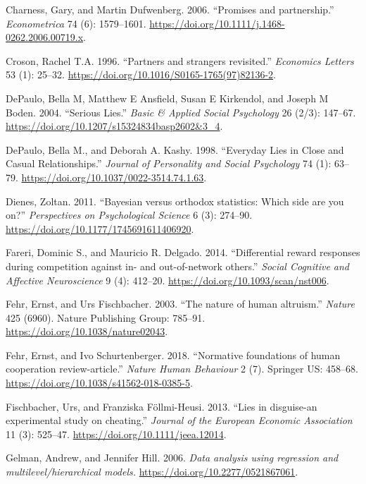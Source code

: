 \documentclass[smallextended]{svjour3}       %
\begin{document}
\leavevmode\hypertarget{ref-Charness2006}{}%
Charness, Gary, and Martin Dufwenberg. 2006. ``Promises and
partnership.'' \emph{Econometrica} 74 (6): 1579--1601.
\url{https://doi.org/10.1111/j.1468-0262.2006.00719.x}.

\leavevmode\hypertarget{ref-Croson1996}{}%
Croson, Rachel T.A. 1996. ``Partners and strangers revisited.''
\emph{Economics Letters} 53 (1): 25--32.
\url{https://doi.org/10.1016/S0165-1765(97)82136-2}.

\leavevmode\hypertarget{ref-DePaulo2004}{}%
DePaulo, Bella M, Matthew E Ansfield, Susan E Kirkendol, and Joseph M
Boden. 2004. ``Serious Lies.'' \emph{Basic \& Applied Social Psychology}
26 (2/3): 147--67. \url{https://doi.org/10.1207/s15324834basp2602\&3_4}.

\leavevmode\hypertarget{ref-DePaulo1998}{}%
DePaulo, Bella M., and Deborah A. Kashy. 1998. ``Everyday Lies in Close
and Casual Relationships.'' \emph{Journal of Personality and Social
Psychology} 74 (1): 63--79.
\url{https://doi.org/10.1037/0022-3514.74.1.63}.

\leavevmode\hypertarget{ref-Dienes2011}{}%
Dienes, Zoltan. 2011. ``Bayesian versus orthodox statistics: Which side
are you on?'' \emph{Perspectives on Psychological Science} 6 (3):
274--90. \url{https://doi.org/10.1177/1745691611406920}.

\leavevmode\hypertarget{ref-Fareri2014}{}%
Fareri, Dominic S., and Mauricio R. Delgado. 2014. ``Differential reward
responses during competition against in- and out-of-network others.''
\emph{Social Cognitive and Affective Neuroscience} 9 (4): 412--20.
\url{https://doi.org/10.1093/scan/nst006}.

\leavevmode\hypertarget{ref-Fehr2003}{}%
Fehr, Ernst, and Urs Fischbacher. 2003. ``The nature of human
altruism.'' \emph{Nature} 425 (6960). Nature Publishing Group: 785--91.
\url{https://doi.org/10.1038/nature02043}.

\leavevmode\hypertarget{ref-Fehr2018}{}%
Fehr, Ernst, and Ivo Schurtenberger. 2018. ``Normative foundations of
human cooperation review-article.'' \emph{Nature Human Behaviour} 2 (7).
Springer US: 458--68. \url{https://doi.org/10.1038/s41562-018-0385-5}.

\leavevmode\hypertarget{ref-Fischbacher2013a}{}%
Fischbacher, Urs, and Franziska Föllmi-Heusi. 2013. ``Lies in
disguise-an experimental study on cheating.'' \emph{Journal of the
European Economic Association} 11 (3): 525--47.
\url{https://doi.org/10.1111/jeea.12014}.

\leavevmode\hypertarget{ref-Gelman2006}{}%
Gelman, Andrew, and Jennifer Hill. 2006. \emph{Data analysis using
regression and multilevel/hierarchical models.}
\url{https://doi.org/10.2277/0521867061}.
\end{document}
